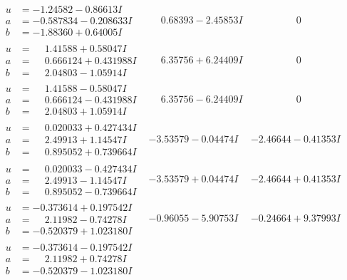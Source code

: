 \documentclass[1p]{elsarticle_modified}
\theoremstyle{definition}
\begin{document}
$$\begin{array}{c|c|c}
\begin{aligned}
u &= -1.24582 - 0.86613 I \\
a &= -0.587834 - 0.208633 I \\
b &= -1.88360 + 0.64005 I\end{aligned}
 & \phantom{-}0.68393 - 2.45853 I & \phantom{-0.000000 } 0 \\ \hline\begin{aligned}
u &= \phantom{-}1.41588 + 0.58047 I \\
a &= \phantom{-}0.666124 + 0.431988 I \\
b &= \phantom{-}2.04803 - 1.05914 I\end{aligned}
 & \phantom{-}6.35756 + 6.24409 I & \phantom{-0.000000 } 0 \\ \hline\begin{aligned}
u &= \phantom{-}1.41588 - 0.58047 I \\
a &= \phantom{-}0.666124 - 0.431988 I \\
b &= \phantom{-}2.04803 + 1.05914 I\end{aligned}
 & \phantom{-}6.35756 - 6.24409 I & \phantom{-0.000000 } 0 \\ \hline\begin{aligned}
u &= \phantom{-}0.020033 + 0.427434 I \\
a &= \phantom{-}2.49913 + 1.14547 I \\
b &= \phantom{-}0.895052 + 0.739664 I\end{aligned}
 & -3.53579 - 0.04474 I & -2.46644 - 0.41353 I \\ \hline\begin{aligned}
u &= \phantom{-}0.020033 - 0.427434 I \\
a &= \phantom{-}2.49913 - 1.14547 I \\
b &= \phantom{-}0.895052 - 0.739664 I\end{aligned}
 & -3.53579 + 0.04474 I & -2.46644 + 0.41353 I \\ \hline\begin{aligned}
u &= -0.373614 + 0.197542 I \\
a &= \phantom{-}2.11982 - 0.74278 I \\
b &= -0.520379 + 1.023180 I\end{aligned}
 & -0.96055 - 5.90753 I & -0.24664 + 9.37993 I \\ \hline\begin{aligned}
u &= -0.373614 - 0.197542 I \\
a &= \phantom{-}2.11982 + 0.74278 I \\
b &= -0.520379 - 1.023180 I\end{aligned}

\end{array}$$
\end{document}
